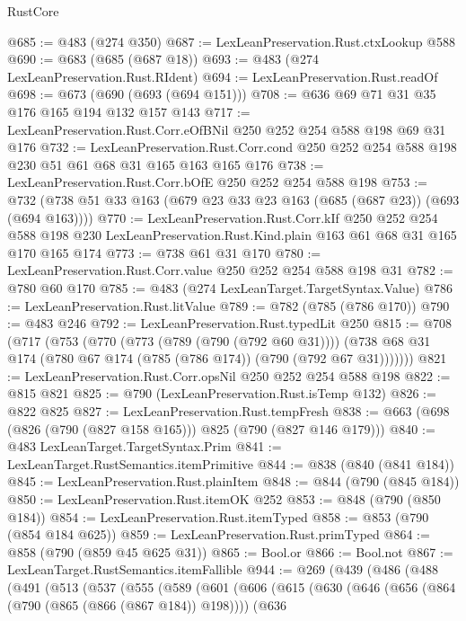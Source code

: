 \begin{lexlean}{RustCore}
\begin{coremodule}
@685 := @483 (@274 @350)
@687 := LexLeanPreservation.Rust.ctxLookup @588
@690 := @683 (@685 (@687 @18))
@693 := @483 (@274 LexLeanPreservation.Rust.RIdent)
@694 := LexLeanPreservation.Rust.readOf
@698 := @673 (@690 (@693 (@694 @151)))
@708 := @636 @69 @71 @31 @35 @176 @165 @194 @132 @157 @143
@717 := LexLeanPreservation.Rust.Corr.eOfBNil @250 @252 @254 @588 @198 @69 @31 @176
@732 := LexLeanPreservation.Rust.Corr.cond
    @250
    @252
    @254
    @588
    @198
    @230
    @51
    @61
    @68
    @31
    @165
    @163
    @165
    @176
@738 := LexLeanPreservation.Rust.Corr.bOfE @250 @252 @254 @588 @198
@753 := @732 (@738 @51 @33 @163 (@679 @23 @33 @23 @163 (@685 (@687 @23)) (@693 (@694 @163))))
@770 := LexLeanPreservation.Rust.Corr.kIf
    @250
    @252
    @254
    @588
    @198
    @230
    LexLeanPreservation.Rust.Kind.plain
    @163
    @61
    @68
    @31
    @165
    @170
    @165
    @174
@773 := @738 @61 @31 @170
@780 := LexLeanPreservation.Rust.Corr.value @250 @252 @254 @588 @198 @31
@782 := @780 @60 @170
@785 := @483 (@274 LexLeanTarget.TargetSyntax.Value)
@786 := LexLeanPreservation.Rust.litValue
@789 := @782 (@785 (@786 @170))
@790 := @483 @246
@792 := LexLeanPreservation.Rust.typedLit @250
@815 := @708
    (@717
      (@753
        (@770
          (@773 (@789 (@790 (@792 @60 @31))))
          (@738 @68 @31 @174 (@780 @67 @174 (@785 (@786 @174)) (@790 (@792 @67 @31)))))))
@821 := LexLeanPreservation.Rust.Corr.opsNil @250 @252 @254 @588 @198
@822 := @815 @821
@825 := @790 (LexLeanPreservation.Rust.isTemp @132)
@826 := @822 @825
@827 := LexLeanPreservation.Rust.tempFresh
@838 := @663 (@698 (@826 (@790 (@827 @158 @165))) @825 (@790 (@827 @146 @179)))
@840 := @483 LexLeanTarget.TargetSyntax.Prim
@841 := LexLeanTarget.RustSemantics.itemPrimitive
@844 := @838 (@840 (@841 @184))
@845 := LexLeanPreservation.Rust.plainItem
@848 := @844 (@790 (@845 @184))
@850 := LexLeanPreservation.Rust.itemOK @252
@853 := @848 (@790 (@850 @184))
@854 := LexLeanPreservation.Rust.itemTyped
@858 := @853 (@790 (@854 @184 @625))
@859 := LexLeanPreservation.Rust.primTyped
@864 := @858 (@790 (@859 @45 @625 @31))
@865 := Bool.or
@866 := Bool.not
@867 := LexLeanTarget.RustSemantics.itemFallible
@944 := @269
    (@439
      (@486
        (@488
          (@491
            (@513
              (@537
                (@555
                  (@589
                    (@601
                      (@606
                        (@615
                          (@630
                            (@646
                              (@656 (@864 (@790 (@865 (@866 (@867 @184)) @198))))
                              (@636

\end{coremodule}
\end{lexlean}
